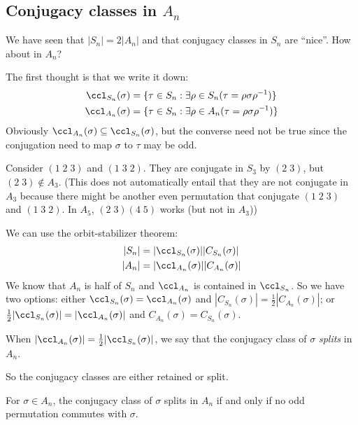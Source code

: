 \documentclass[a4paper]{article}
\begin{document}
  \subsection{Conjugacy classes in \texorpdfstring{$A_n$}{An}}
  We have seen that $|S_n| = 2|A_n|$ and that conjugacy classes in $S_n$ are ``nice''. How about in $A_n$?

  The first thought is that we write it down:
  \begin{align*}
    \ccl_{S_n}(\sigma) &= \{\tau\in S_n: \exists \rho \in S_n(\tau = \rho\sigma\rho^{-1})\}\\
    \ccl_{A_n}(\sigma) &= \{\tau\in S_n: \exists \rho \in A_n(\tau = \rho\sigma\rho^{-1})\}
  \end{align*}
  Obviously $\ccl_{A_n}(\sigma)\subseteq \ccl_{S_n}(\sigma)$, but the converse need not be true since the conjugation need to map $\sigma$ to $\tau$ may be odd. 

  \begin{eg}
    Consider $(1\; 2\; 3)$ and $(1\; 3\; 2)$. They are conjugate in $S_3$ by $(2\; 3)$, but $(2\; 3)\not\in A_3$. (This does not automatically entail that they are not conjugate in $A_3$ because there might be another even permutation that conjugate $(1\; 2\; 3)$ and $(1\; 3\; 2)$. In $A_5$, $(2\; 3)(4\; 5)$ works (but not in $A_3$))
  \end{eg}

  We can use the orbit-stabilizer theorem:
  \begin{align*}
    |S_n| &= |\ccl_{S_n}(\sigma)||C_{S_n}(\sigma)|\\
    |A_n| &= |\ccl_{A_n}(\sigma)||C_{A_n}(\sigma)|
  \end{align*}
  We know that $A_n$ is half of $S_n$ and $\ccl_{A_n}$ is contained in $\ccl_{S_n}$. So we have two options: either $\ccl_{S_n}(\sigma) = \ccl_{A_n}(\sigma)$ and $|C_{S_n}(\sigma)| = \frac{1}{2}|C_{A_n}(\sigma)|$; or $\frac{1}{2}|\ccl_{S_n}(\sigma)| = |\ccl_{A_n}(\sigma)|$ and $C_{A_n}(\sigma) = C_{S_n}(\sigma)$.

  \begin{defi}
    When $|\ccl_{A_n}(\sigma)| = \frac{1}{2}|\ccl_{S_n}(\sigma)|$, we say that the conjugacy class of $\sigma$ \emph{splits} in $A_n$. 
  \end{defi}

  So the conjugacy classes are either retained or split.

  \begin{prop}
    For $\sigma\in A_n$, the conjugacy class of $\sigma$ splits in $A_n$ if and only if no odd permutation commutes with $\sigma$. 
  \end{prop}
\end{document}
